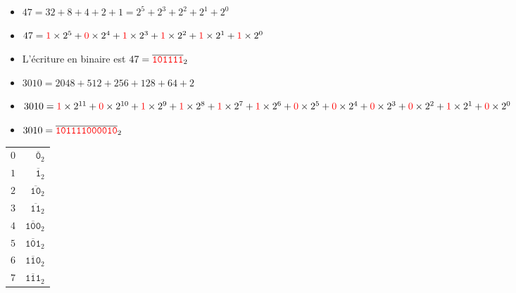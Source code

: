\begin{frame}


\pause



\begin{itemize}
  \pause
  \item $47 = 32 + 8 + 4 + 2 + 1 = 2^5 + 2^3 + 2^2 + 2^1 + 2^0$
  \pause
  \item $47
= {\color{red}1}\times 2^5 
+ {\color{red}0}\times 2^4
+ {\color{red}1}\times 2^3 
+ {\color{red}1}\times 2^2 
+ {\color{red}1}\times 2^1 
+ {\color{red}1}\times 2^0$
  \pause
  \item L'écriture en binaire est 
  $47 = \overline{{\color{red}\mathtt{101111}}}_2$
\end{itemize}


\bigskip

\begin{itemize}
  \pause
  \item $3010 = 2048 + 512 + 256 + 128 + 64 + 2$
  
    \pause
  \item $3010 = {\color{red}1}\times 2^{11}
+ {\color{red}0}\times 2^{10}
+ {\color{red}1}\times 2^9 
+ {\color{red}1}\times 2^8 
+ {\color{red}1}\times 2^7 
+ {\color{red}1}\times 2^6
+ {\color{red}0}\times 2^5
+ {\color{red}0}\times 2^4
+ {\color{red}0}\times 2^3
+ {\color{red}0}\times 2^2
+ {\color{red}1}\times 2^1
+ {\color{red}0}\times 2^0$

\pause
  \item $3010 = \overline{{\color{red}\mathtt{101111000010}}}_2$
\end{itemize}

\end{frame}



\begin{frame}



\begin{center}
\begin{tabular}{rr}
$0$ & $\overline{\mathtt{0}}_2$ \\
$1$ & $\overline{\mathtt{1}}_2$ \\
$2$ & $\overline{\mathtt{10}}_2$ \\
$3$ & $\overline{\mathtt{11}}_2$ \\
$4$ & $\overline{\mathtt{100}}_2$ \\
$5$ & $\overline{\mathtt{101}}_2$ \\
$6$ & $\overline{\mathtt{110}}_2$ \\
$7$ & $\overline{\mathtt{111}}_2$ \\
\end{tabular}
\end{center}

\end{frame}




